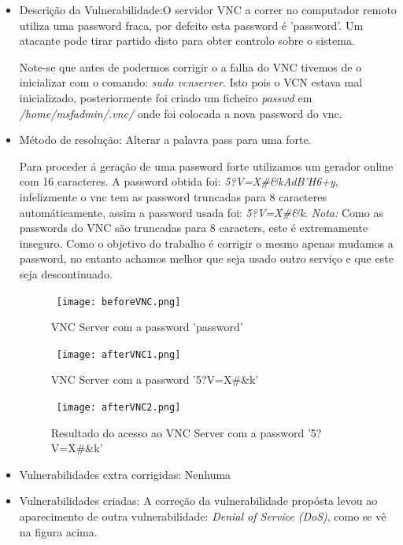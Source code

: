 \begin{itemize}
\item Descrição da Vulnerabilidade:O servidor VNC a correr no computador remoto utiliza uma password fraca, por defeito esta password é 'password'. Um atacante pode tirar partido disto para obter controlo sobre o sistema.
\par Note-se que antes de podermos corrigir o a falha do VNC tivemos de o inicializar com o comando: \textit{sudo vcnserver}. Isto pois o VCN estava mal inicializado, posteriormente foi criado um ficheiro \textit{passwd} em \textit{/home/msfadmin/.vnc/} onde foi colocada a nova password do vnc.

\item Método de resolução: Alterar a palavra pass para uma forte.
\par Para proceder á geração de uma password forte utilizamos um gerador online com 16 caracteres. A password obtida foi: \textit{5?V=X\#\&kAdB'H6+y}, infelizmente o vnc tem as password truncadas para 8 caracteres automáticamente, assim a password usada foi: \textit{5?V=X\#\&k}.\newline
\textit{Nota:} Como as passwords do VNC são truncadas para 8 caracters, este é extremamente inseguro. Como o objetivo do trabalho é corrigir o mesmo apenas mudamos a password, no entanto achamos melhor que seja usado outro serviço e que este seja descontinuado.
\begin{figure}[H]

  \centering

  \hbox{\hspace{-6em} \texttt{[image: beforeVNC.png]}}

  \caption {VNC Server com a password 'password'}

  \label {fig3}

\end{figure}
\begin{figure}[H]

  \centering

  \hbox{\hspace{-6em} \texttt{[image: afterVNC1.png]}}

  \caption {VNC Server com a password '5?V=X\#\&k'}

  \label {fig3}

\end{figure}
\begin{figure}[H]

  \centering

  \hbox{\hspace{-6em} \texttt{[image: afterVNC2.png]}}

  \caption {Resultado do acesso ao VNC Server com a password '5?V=X\#\&k'}

  \label {fig3}

\end{figure}
\item Vulnerabilidades extra corrigidas: Nenhuma
\item Vulnerabilidades criadas: A correção da vulnerabilidade propósta levou ao aparecimento de outra vulnerabilidade: \textit{Denial of Service (DoS)}, como se vê na figura acima.
\end{itemize}
\clearpage
